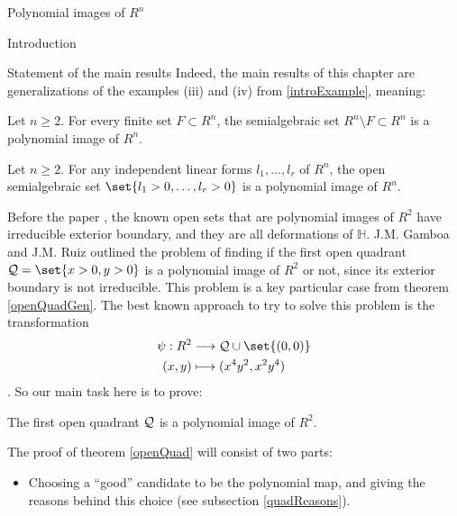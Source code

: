 \documentclass[11pt, a4paper, english, twoside, notitlepage]{report}
\begin{document}
\begin{chapter}{Polynomial images of $R^n$}
\begin{section}{Introduction}
\begin{subsection}{Statement of the main results}
	Indeed, the main results of this chapter are generalizations of the examples (iii) and (iv) from \ref{introExample}, meaning:
	
	\begin{theorem}\label{finSetTh}
		
		Let $n \ge 2$. For every finite set $F\subset R^n$, the semialgebraic set $R^n \setminus F \subset R^n$ is a polynomial image of $R^n$.
		
	\end{theorem}
	
	\begin{theorem}\label{openQuadGen}
		
		Let $n \ge 2$. For any independent linear forms $l_1, \dots, l_r$ of $R^n$, the open semialgebraic set $\set{l_1>0, \dots, l_r>0}$ is a polynomial image of $R^n$.
		
	\end{theorem}
	
	Before the paper \cite{fg}, the known open sets that are polynomial images of $R^2$ have irreducible exterior boundary, and they are all deformations of $\mathbb{H}$. J.M. Gamboa and J.M. Ruiz outlined the problem of finding if the first open quadrant $\Qu = \set{x > 0, y > 0}$ is a polynomial image of $R^2$ or not, since its exterior boundary is not irreducible. This problem is a key particular case from theorem \ref{openQuadGen}. The best known approach to try to solve this problem is the transformation
	\begin{align*}
			\psi: R^2 & \longrightarrow \Qu \cup \set{(0, 0)}\\
			(x,y) & \longmapsto (x^4 y^2,x^2 y^4)
	\end{align*}
	. So our main task here is to prove:
	
	\begin{theorem}\label{openQuad}
		
		The first open quadrant $\mathcal{Q}$ is a polynomial image of $R^2$.
		
	\end{theorem}
	
	The proof of theorem \ref{openQuad} will consist of two parts:
	
	\begin{itemize}
	
		\item Choosing a ``good'' candidate to be the polynomial map, and giving the reasons behind this choice (see subsection \ref{quadReasons}). 
	

\end{itemize}
\end{subsection}
\end{section}
\end{chapter}
\end{document}
